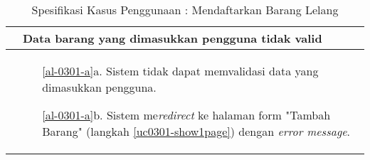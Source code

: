 \begin{table}[H]
\begin{tabular}{|r|p{8cm}|}
		\multicolumn{1}{|l|}{}                                           & \textbf{Data barang yang dimasukkan pengguna tidak valid}
			\\ \hline
		\multicolumn{1}{|l|}{}                                           & 
			 \begin{itemize}
			 	\item[\ref{al-0301-a}a.] Sistem tidak dapat memvalidasi data yang dimasukkan pengguna.
			 	\item[\ref{al-0301-a}b.] Sistem me\textit{redirect} ke halaman form "Tambah Barang" (langkah \ref{uc0301-show1page}) dengan \textit{error message}.
			 \end{itemize}
		 \\ \hline
	\end{tabular}
	\caption{Spesifikasi Kasus Penggunaan : Mendaftarkan Barang Lelang}
	\label{uc03.01-tab}
\end{table}